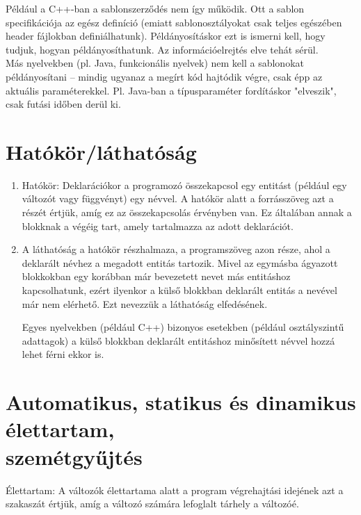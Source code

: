 \documentclass[12pt,margin=0px]{article}
\begin{document}
    \noindent Például a C++-ban a sablonszerződés nem így működik. Ott a sablon specifikációja az egész definíció (emiatt sablonosztályokat csak teljes egészében header fájlokban definiálhatunk).
	Példányosításkor ezt is ismerni kell, hogy tudjuk, hogyan példányosíthatunk. Az információelrejtés elve tehát sérül.\\
	
	\noindent Más nyelvekben (pl. Java, funkcionális nyelvek) nem kell a sablonokat példányosítani – mindig ugyanaz a
	megírt kód hajtódik végre, csak épp az aktuális paraméterekkel. Pl. Java-ban a típusparaméter fordításkor "elveszik",
	csak futási időben derül ki.
	
	\section{Hatókör/láthatóság}
	
	\begin{enumerate}
        \item Hatókör: Deklarációkor a programozó összekapcsol egy entitást (például egy változót vagy függvényt) egy névvel. A hatókör alatt a forrásszöveg azt a részét értjük, amíg ez az összekapcsolás érvényben van. Ez általában annak a blokknak a végéig tart, amely tartalmazza az adott deklarációt.
		
        \item A láthatóság a hatókör részhalmaza, a programszöveg azon része, ahol a deklarált névhez a megadott entitás tartozik. Mivel az egymásba ágyazott blokkokban egy korábban már bevezetett nevet más entitáshoz kapcsolhatunk, ezért ilyenkor a külső blokkban deklarált entitás a nevével már nem elérhető. Ezt nevezzük a láthatóság elfedésének.
		
        Egyes nyelvekben (például C++) bizonyos esetekben (például osztályszintű adattagok) a külső blokkban deklarált entitáshoz minősített névvel hozzá lehet férni ekkor is.
	\end{enumerate}
	
	\section{Automatikus, statikus és dinamikus élettartam,\\ szemétgyűjtés}

    Élettartam: A változók élettartama alatt a program végrehajtási idejének azt a szakaszát értjük, amíg a változó számára lefoglalt tárhely a változóé.
	
\end{document}
